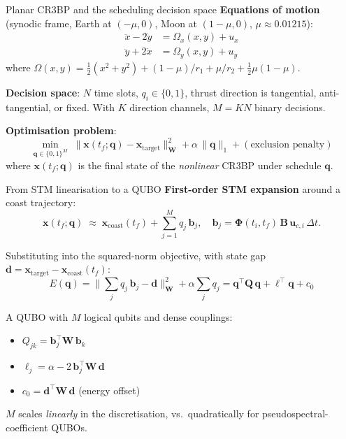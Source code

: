 \documentclass[10pt,aspectratio=169]{beamer}
\newcommand{\bvec}[1]{\bm{#1}}
\newcommand{\xvec}{\bvec{x}}
\newcommand{\uvec}{\bvec{u}}
\newcommand{\qvec}{\bvec{q}}
\newcommand{\bbvec}{\bvec{b}}
\newcommand{\dvec}{\bvec{d}}
\newcommand{\Bmat}{\bvec{B}}
\newcommand{\Qmat}{\bvec{Q}}
\newcommand{\Wmat}{\bvec{W}}
\newcommand{\Phimat}{\bvec{\Phi}}
\begin{document}
\begin{frame}{Planar CR3BP and the scheduling decision space}
\textbf{Equations of motion} (synodic frame, Earth at $(-\mu,0)$,
Moon at $(1-\mu,0)$, $\mu \approx 0.01215$):
\begin{align*}
  \ddot x - 2\dot y &= \Omega_x(x,y) + u_x \\
  \ddot y + 2\dot x &= \Omega_y(x,y) + u_y
\end{align*}
where $\Omega(x,y) = \tfrac{1}{2}(x^2+y^2) + (1-\mu)/r_1 + \mu/r_2 +
\tfrac{1}{2}\mu(1-\mu)$.

\medskip
\textbf{Decision space}: $N$ time slots,
$q_i \in \{0,1\}$, thrust direction is tangential, anti-tangential,
or fixed. With $K$ direction channels, $M = K N$ binary decisions.

\medskip
\textbf{Optimisation problem}:
\[
  \min_{\qvec \in \{0,1\}^M}
  \; \big\| \xvec(t_f; \qvec) - \xvec_\mathrm{target}\big\|_{\Wmat}^2
  + \alpha\,\|\qvec\|_1
  + (\text{exclusion penalty})
\]
where $\xvec(t_f; \qvec)$ is the final state of the
\emph{nonlinear} CR3BP under schedule $\qvec$.
\end{frame}

\begin{frame}{From STM linearisation to a QUBO}
\textbf{First-order STM expansion} around a coast trajectory:
\[
  \xvec(t_f; \qvec) \;\approx\;
    \xvec_\mathrm{coast}(t_f) + \sum_{j=1}^M q_j\, \bbvec_j,
  \quad
  \bbvec_j = \Phimat(t_i,t_f)\,\Bmat\,\uvec_{c,i}\,\Delta t.
\]

\medskip
Substituting into the squared-norm objective, with state gap
$\dvec = \xvec_\mathrm{target} - \xvec_\mathrm{coast}(t_f)$:
\[
  E(\qvec) =
  \Big\| \sum_j q_j\,\bbvec_j - \dvec\Big\|_{\Wmat}^2
  + \alpha\sum_j q_j
  = \qvec^\top \Qmat\, \qvec + \bvec{\ell}^\top \qvec + c_0
\]

\medskip
A QUBO with $M$ logical qubits and dense couplings:
\begin{itemize}[itemsep=2pt]
  \item $Q_{jk} = \bbvec_j^\top \Wmat\, \bbvec_k$
  \item $\ell_j = \alpha - 2\, \bbvec_j^\top \Wmat\, \dvec$
  \item $c_0 = \dvec^\top \Wmat\, \dvec$ (energy offset)
\end{itemize}

\medskip
$M$ scales \emph{linearly} in the discretisation, vs.\ quadratically
for pseudospectral-coefficient QUBOs.
\end{frame}
\end{document}
